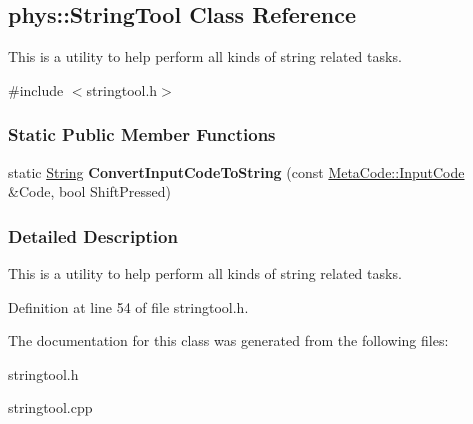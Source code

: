 \hypertarget{classphys_1_1StringTool}{
\subsection{phys::StringTool Class Reference}
\label{classphys_1_1StringTool}
}


This is a utility to help perform all kinds of string related tasks.  




{\ttfamily \#include $<$stringtool.h$>$}

\subsubsection*{Static Public Member Functions}
\begin{DoxyCompactItemize}
\item 
\hypertarget{classphys_1_1StringTool_a775c1f58c263c7489a29c7cc02ab99a4}{
static \hyperlink{namespacephys_aa03900411993de7fbfec4789bc1d392e}{String} {\bfseries ConvertInputCodeToString} (const \hyperlink{classphys_1_1MetaCode_a3e501cbb5bf0f6f1fdb7211465bda8d8}{MetaCode::InputCode} \&Code, bool ShiftPressed)}
\label{classphys_1_1StringTool_a775c1f58c263c7489a29c7cc02ab99a4}

\end{DoxyCompactItemize}


\subsubsection{Detailed Description}
This is a utility to help perform all kinds of string related tasks. 

Definition at line 54 of file stringtool.h.



The documentation for this class was generated from the following files:\begin{DoxyCompactItemize}
\item 
stringtool.h\item 
stringtool.cpp\end{DoxyCompactItemize}
